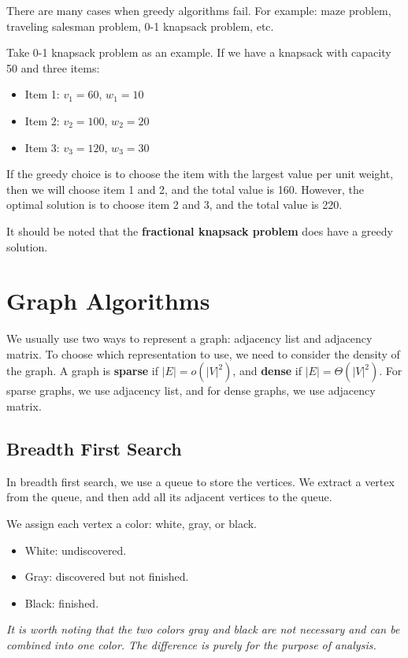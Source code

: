 \documentclass[a4paper,12pt]{article}
\begin{document}
There are many cases when greedy algorithms fail.
For example: maze problem, traveling salesman problem, 0-1 knapsack problem, etc.

Take 0-1 knapsack problem as an example.
If we have a knapsack with capacity 50 and three items:
\begin{itemize}
	\item Item 1: $v_1 = 60$, $w_1 = 10$
	\item Item 2: $v_2 = 100$, $w_2 = 20$
	\item Item 3: $v_3 = 120$, $w_3 = 30$
\end{itemize}

If the greedy choice is to choose the item with the largest value per unit weight, then we will choose item 1 and 2, and the total value is 160.
However, the optimal solution is to choose item 2 and 3, and the total value is 220.

It should be noted that the \textbf{fractional knapsack problem} does have a greedy solution.

\section{Graph Algorithms}

We usually use two ways to represent a graph: adjacency list and adjacency matrix.
To choose which representation to use, we need to consider the density of the graph.
A graph is \textbf{sparse} if $|E| = o(|V|^2)$, and \textbf{dense} if $|E| = \Theta(|V|^2)$.
For sparse graphs, we use adjacency list, and for dense graphs, we use adjacency matrix.

\subsection{Breadth First Search}

In breadth first search, we use a queue to store the vertices.
We extract a vertex from the queue, and then add all its adjacent vertices to the queue.

We assign each vertex a color: white, gray, or black.
\begin{itemize}
	\item White: undiscovered.
	\item Gray: discovered but not finished.
	\item Black: finished.
\end{itemize}
\textit{It is worth noting that the two colors gray and black are not necessary and can be combined into one color.
The difference is purely for the purpose of analysis.}
\end{document}
